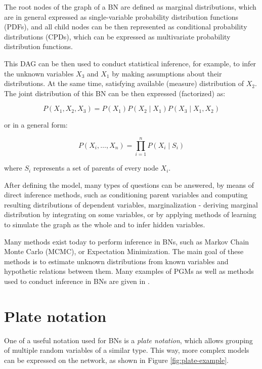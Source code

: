 The root nodes of the graph of a BN are defined as marginal distributions, which are in general expressed as single-variable probability distribution functions (PDFs), and all child nodes can be then represented as conditional probability distributions (CPDs), which can be expressed as multivariate probability distribution functions. 

This DAG can be then used to conduct statistical inference, for example, to infer the unknown variables $X_3$ and $X_1$ by making assumptions about their distributions. At the same time, satisfying available (measure) distribution of $X_2$. The joint distribution of this BN can be then expressed (factorized) as:

\begin{equation}
P{(X_1, X_2, X_3)} = P{(X_1)} P{(X_2 \mid X_1)} P{(X_3 \mid X_1, X_2)}
\end{equation}

or in a general form:

\begin{equation}
P{(X_i, \ldots, X_n)} = \prod_{i=1}^{n} P{(X_i \mid S_i)}
\end{equation}

where $S_i$ represents a set of parents of every node $X_i$.

After defining the model, many types of questions can be answered, by means of direct inference methods, such as conditioning parent variables and computing resulting distributions of dependent variables, marginalization - deriving marginal distribution by integrating on some variables,  or by applying methods of learning to simulate the graph as the whole and to infer hidden variables.

Many methods exist today to perform inference in BNs, such as Markov Chain Monte Carlo (MCMC), or Expectation Minimization. The main goal of these methods is to estimate unknown distributions from known variables and hypothetic relations between them. Many examples of PGMs as well as methods used to conduct inference in BNs are given in \cite{koller2009probabilistic}. 

\section{Plate notation}

One of a useful notation used for BNs is a \textit{plate notation}, which allows grouping of multiple random variables of a similar type. This way, more complex models can be expressed on the network, as shown in Figure \ref{fig:plate-example}.

